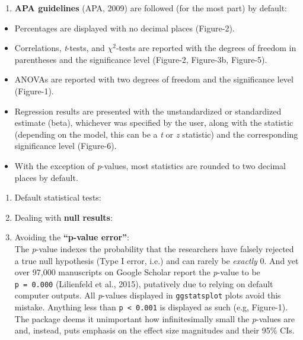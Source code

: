 \documentclass[]{article}
\providecommand{\tightlist}{%
  \setlength{\itemsep}{0pt}\setlength{\parskip}{0pt}}
\begin{document}
\begin{enumerate}
\def\labelenumi{\arabic{enumi}.}
\tightlist
\item
  \textbf{APA guidelines} (APA, 2009) are followed (for the most part)
  by default:\\
\end{enumerate}

\begin{itemize}
\tightlist
\item
  Percentages are displayed with no decimal places (Figure-2).
\item
  Correlations, \emph{t}-tests, and \(\chi^2\)-tests are reported with
  the degrees of freedom in parentheses and the significance level
  (Figure-2, Figure-3b, Figure-5).
\item
  ANOVAs are reported with two degrees of freedom and the significance
  level (Figure-1).
\item
  Regression results are presented with the unstandardized or
  standardized estimate (beta), whichever was specified by the user,
  along with the statistic (depending on the model, this can be a
  \emph{t} or \emph{z} statistic) and the corresponding significance
  level (Figure-6).
\item
  With the exception of \emph{p}-values, most statistics are rounded to
  two decimal places by default.
\end{itemize}

\begin{enumerate}
\def\labelenumi{\arabic{enumi}.}
\setcounter{enumi}{1}
\item
  Default statistical tests:
\item
  Dealing with \textbf{null results}:
\item
  Avoiding the \textbf{``p-value error''}:\\
  The \emph{p}-value indexes the probability that the researchers have
  falsely rejected a true null hypothesis (Type I error, i.e.) and can
  rarely be \emph{exactly} 0. And yet over 97,000 manuscripts on Google
  Scholar report the \emph{p}-value to be \texttt{p\ =\ 0.000}
  (Lilienfeld et al., 2015), putatively due to relying on default
  computer outputs. All \emph{p}-values displayed in
  \texttt{ggstatsplot} plots avoid this mistake. Anything less than
  \texttt{p\ \textless{}\ 0.001} is displayed as such (e.g, Figure-1).
  The package deems it unimportant how infinitesimally small the
  \emph{p}-values are and, instead, puts emphasis on the effect size
  magnitudes and their 95\% CIs.
\end{enumerate}
\end{document}
